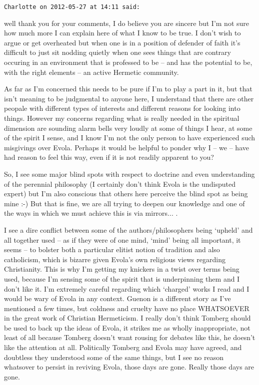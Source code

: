 \begin{footnotesize}
\begin{sffamily}
\hfill

\texttt{Charlotte on 2012-05-27 at 14:11 said:}

well thank you for your comments, I do believe you are sincere but I'm not sure how much more I can explain here of what I know to be true. I don't wish to argue or get overheated but when one is in a position of defender of faith it's difficult to just sit nodding quietly when one sees things that are contrary occuring in an environment that is professed to be -- and has the potential to be, with the right elements -- an active Hermetic community.

As far as I'm concerned this needs to be pure if I'm to play a part in it, but that isn't meaning to be judgmental to anyone here, I understand that there are other peopale with different types of interests and different reasons for looking into things. However my concerns regarding what is really needed in the spiritual dimension are sounding alarm bells very loudly at some of things I hear, at some of the spirit I sense, and I know I'm not the only person to have experienced such misgivings over Evola. Perhaps it would be helpful to ponder why I -- we -- have had reason to feel this way, even if it is not readily apparent to you?

So, I see some major blind spots with respect to doctrine and even understanding of the perennial philosophy (I certainly don't think Evola is the undisputed expert) but I'm also conscious that others here perceive the blind spot as being mine :-) But that is fine, we are all trying to deepen our knowledge and one of the ways in which we must achieve this is via mirrors... .

I see a dire conflict between some of the authors/philosophers being `upheld' and all together used -- as if they were of one mind, `mind' being all important, it seems -- to bolster both a particular elitist notion of tradition and also catholicism, which is bizarre given Evola's own religious views regarding Christianity. This is why I'm getting my knickers in a twist over terms being used, because I'm sensing some of the spirit that is underpinning them and I don't like it. I'm extremely careful regarding which `charged' works I read and I would be wary of Evola in any context. Guenon is a different story as I've mentioned a few times, but coldness and cruelty have no place WHATSOEVER in the great work of Christian Hermeticism. I really don't think Tomberg should be used to back up the ideas of Evola, it strikes me as wholly inappropriate, not least of all because Tomberg doesn't want rousing for debates like this, he doesn't like the attention at all. Politically Tomberg and Evola may have agreed, and doubtless they understood some of the same things, but I see no reason whatsover to persist in reviving Evola, those days are gone. Really those days are gone.


\end{sffamily}
\end{footnotesize}
